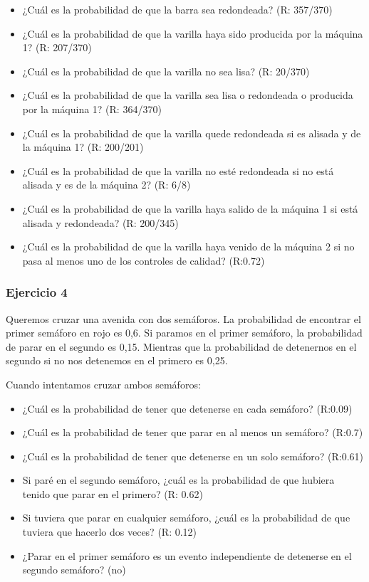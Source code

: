 \documentclass[
]{book}
\providecommand{\tightlist}{%
  \setlength{\itemsep}{0pt}\setlength{\parskip}{0pt}}
\begin{document}
\begin{itemize}
\tightlist
\item
  ¿Cuál es la probabilidad de que la barra sea redondeada? (R: 357/370)
\item
  ¿Cuál es la probabilidad de que la varilla haya sido producida por la máquina 1? (R: 207/370)
\item
  ¿Cuál es la probabilidad de que la varilla no sea lisa? (R: 20/370)
\item
  ¿Cuál es la probabilidad de que la varilla sea lisa o redondeada o producida por la máquina 1? (R: 364/370)
\item
  ¿Cuál es la probabilidad de que la varilla quede redondeada si es alisada y de la máquina 1? (R: 200/201)
\item
  ¿Cuál es la probabilidad de que la varilla no esté redondeada si no está alisada y es de la máquina 2? (R: 6/8)
\item
  ¿Cuál es la probabilidad de que la varilla haya salido de la máquina 1 si está alisada y redondeada? (R: 200/345)
\item
  ¿Cuál es la probabilidad de que la varilla haya venido de la máquina 2 si no pasa al menos uno de los controles de calidad? (R:0.72)
\end{itemize}

\hypertarget{ejercicio-4}{%
\subsubsection{Ejercicio 4}\label{ejercicio-4}}

Queremos cruzar una avenida con dos semáforos. La probabilidad de encontrar el primer semáforo en rojo es 0,6. Si paramos en el primer semáforo, la probabilidad de parar en el segundo es 0,15. Mientras que la probabilidad de detenernos en el segundo si no nos detenemos en el primero es 0,25.

Cuando intentamos cruzar ambos semáforos:

\begin{itemize}
\tightlist
\item
  ¿Cuál es la probabilidad de tener que detenerse en cada semáforo? (R:0.09)
\item
  ¿Cuál es la probabilidad de tener que parar en al menos un semáforo? (R:0.7)
\item
  ¿Cuál es la probabilidad de tener que detenerse en un solo semáforo? (R:0.61)
\item
  Si paré en el segundo semáforo, ¿cuál es la probabilidad de que hubiera tenido que parar en el primero? (R: 0.62)
\item
  Si tuviera que parar en cualquier semáforo, ¿cuál es la probabilidad de que tuviera que hacerlo dos veces? (R: 0.12)
\item
  ¿Parar en el primer semáforo es un evento independiente de detenerse en el segundo semáforo? (no)
\end{itemize}
\end{document}
